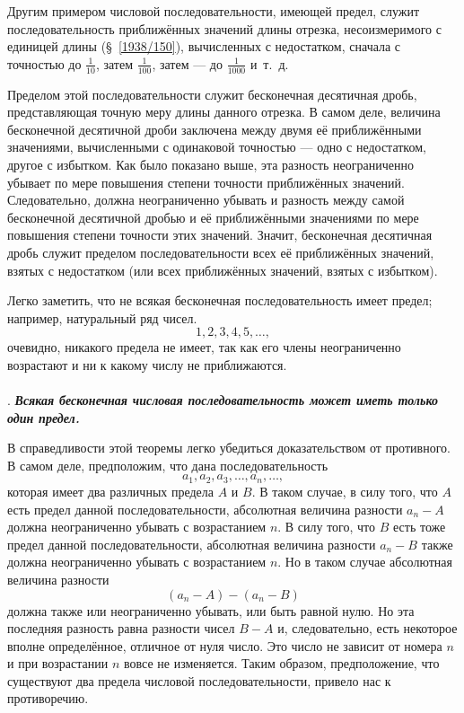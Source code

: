 \documentclass[twoside]{book}
\begin{document}
Другим примером числовой последовательности, имеющей предел, служит последовательность приближённых значений длины отрезка, несоизмеримого с единицей длины (§~\ref{1938/150}), вычисленных с недостатком, сначала с точностью до $\tfrac1{10}$, затем $\tfrac1{100}$, затем — до $\tfrac1{1000}$ и~т.~д.

Пределом этой последовательности служит бесконечная десятичная дробь, представляющая точную меру длины данного отрезка.
В самом деле, величина бесконечной десятичной дроби заключена между двумя её приближёнными значениями, вычисленными с одинаковой точностью — одно с недостатком, другое с избытком. 
Как было показано выше, эта разность неограниченно убывает по мере повышения степени точности приближённых значений.
Следовательно, должна неограниченно убывать и разность между самой бесконечной десятичной дробью и её приближёнными значениями по мере повышения степени точности этих значений.
Значит, бесконечная десятичная дробь служит пределом последовательности всех её приближённых значений, взятых с недостатком (или всех приближённых значений, взятых с избытком).

Легко заметить, что не всякая бесконечная последовательность имеет предел;
например, натуральный ряд чисел.
\[1, 2, 3, 4, 5,\dots,\]
очевидно, никакого предела не имеет, так как его члены неограниченно возрастают и ни к какому числу не приближаются.

\paragraph{}\label{1938/228}
.
\textbf{\emph{Всякая бесконечная числовая последовательность может иметь только один предел.}}

В справедливости этой теоремы легко убедиться доказательством от противного.
В самом деле, предположим, что дана последовательность
\[a_1,a_2,a_3,\dots,a_n,\dots,\]
которая имеет два различных предела $A$ и $B$.
В таком случае, в силу того, что $A$ есть предел данной последовательности, абсолютная величина разности $a_n-A$ должна неограниченно убывать с возрастанием $n$.
В силу того, что $B$ есть тоже предел данной последовательности, абсолютная величина разности $a_n-B$ также должна неограниченно убывать с возрастанием $n$.
Но в таком случае абсолютная величина разности
\[(a_n-A)-(a_n-B)\]
должна также или неограниченно убывать, или быть равной нулю.
Но эта последняя разность равна разности чисел $B-A$ и, следовательно, есть некоторое вполне определённое, отличное от нуля число.
Это число не зависит от номера $n$ и при возрастании $n$ вовсе не изменяется.
Таким образом, предположение, что существуют два предела числовой последовательности, привело нас к противоречию.
\end{document}
